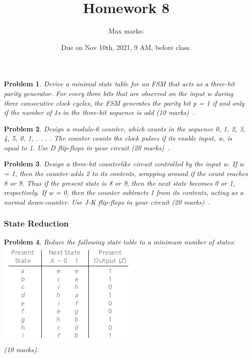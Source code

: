 \documentclass[twocolumn]{article}
\title{Homework 8}
\author{Max marks: }
\date{Due on Nov 10th, 2021, 9 AM, before class.}
\newtheorem{prob}{Problem}
\begin{document}
\maketitle
\begin{prob}
  Derive a minimal state table for an FSM that acts as a three-bit parity
generator. For every three bits that are observed on the input w during three
consecutive clock cycles, the FSM generates the parity bit p = 1 if and only if
the number of 1s in the three-bit sequence is odd (10 marks)~\cite[Prob 6.12]{brown2013fundamentals}.
\end{prob}

\begin{prob}
  Design a modulo-6 counter, which counts in the sequence 0, 1, 2, 3, 4, 5, 0,
1, . . . . The counter counts the clock pulses if its enable input, w, is equal
to 1. Use D flip-flops in your circuit (20 marks)~\cite[Prob 6.23]{brown2013fundamentals}.
\end{prob}


\begin{prob}
  Design a three-bit counterlike circuit controlled by the input w. If w = 1,
then the counter adds 2 to its contents, wrapping around if the count reaches 8
or 9. Thus if the present state is 8 or 9, then the next state becomes 0 or 1,
respectively. If w = 0, then the counter subtracts 1 from its contents, acting
as a normal down-counter. Use J-K flip-flops in your circuit (20
marks)~\cite[Prob 6.26]{brown2013fundamentals}.
\end{prob}

\subsubsection*{State Reduction}
\begin{prob}
  Reduce the following state table to a minimum number of states:\\
  \includegraphics[width=\linewidth]{fig-15.2.png}\\
  (10 marks).
\end{prob}
\end{document}
